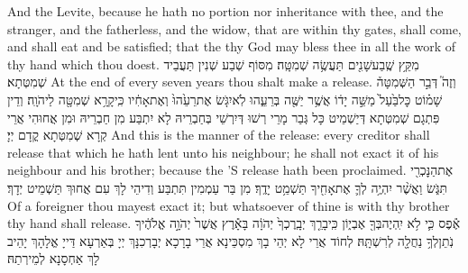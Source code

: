 {And the Levite, because he hath no portion nor inheritance with thee, and the stranger, and the fatherless, and the widow, that are within thy gates, shall come, and shall eat and be satisfied; that the \lord\space thy God may bless thee in all the work of thy hand which thou doest.}{}
\newperek
{}%
{מִקֵּ֥ץ שֶֽׁבַע\maqqaf שָׁנִ֖ים תַּעֲשֶׂ֥ה שְׁמִטָּֽה׃}
{מִסּוֹף שְׁבַע שְׁנִין תַּעֲבֵיד שְׁמִטְּתָא׃}
{At the end of every seven years thou shalt make a release.}{}
{וְזֶה֮ דְּבַ֣ר הַשְּׁמִטָּה֒ שָׁמ֗וֹט כׇּל\maqqaf בַּ֙עַל֙ מַשֵּׁ֣ה יָד֔וֹ אֲשֶׁ֥ר יַשֶּׁ֖ה בְּרֵעֵ֑הוּ לֹֽא\maqqaf יִגֹּ֤שׂ אֶת\maqqaf רֵעֵ֙הוּ֙ וְאֶת\maqqaf אָחִ֔יו כִּֽי\maqqaf קָרָ֥א שְׁמִטָּ֖ה לַיהֹוָֽה׃}
{וְדֵין פִּתְגָם שְׁמִטְּתָא דְּיַשְׁמֵיט כָּל גְּבַר מָרֵי רְשׁוּ דְּיִרְשֵׁי בְּחַבְרֵיהּ לָא יִתְבַּע מִן חַבְרֵיהּ וּמִן אֲחוּהִי אֲרֵי קְרָא שְׁמִטְּתָא קֳדָם יְיָ׃}
{And this is the manner of the release: every creditor shall release that which he hath lent unto his neighbour; he shall not exact it of his neighbour and his brother; because the \lord’S release hath been proclaimed.}{}
{אֶת\maqqaf הַנׇּכְרִ֖י תִּגֹּ֑שׂ וַאֲשֶׁ֨ר יִהְיֶ֥ה לְךָ֛ אֶת\maqqaf אָחִ֖יךָ תַּשְׁמֵ֥ט יָדֶֽךָ׃}
{מִן בַּר עַמְמִין תִּתְבַּע וְדִיהֵי לָךְ עִם אֲחוּךְ תַּשְׁמֵיט יְדָךְ׃}
{Of a foreigner thou mayest exact it; but whatsoever of thine is with thy brother thy hand shall release.}{}
{אֶ֕פֶס כִּ֛י לֹ֥א יִֽהְיֶה\maqqaf בְּךָ֖ אֶבְי֑וֹן כִּֽי\maqqaf בָרֵ֤ךְ יְבָֽרֶכְךָ֙ יְהֹוָ֔ה בָּאָ֕רֶץ אֲשֶׁר֙ יְהֹוָ֣ה אֱלֹהֶ֔יךָ נֹֽתֵן\maqqaf לְךָ֥ נַחֲלָ֖ה לְרִשְׁתָּֽהּ׃}
{לְחוֹד אֲרֵי לָא יְהֵי בָךְ מִסְכֵּינָא אֲרֵי בָרָכָא יְבָרְכִנָּךְ יְיָ בְּאַרְעָא דַּייָ אֱלָהָךְ יָהֵיב לָךְ אַחְסָנָא לְמֵירְתַהּ׃}
